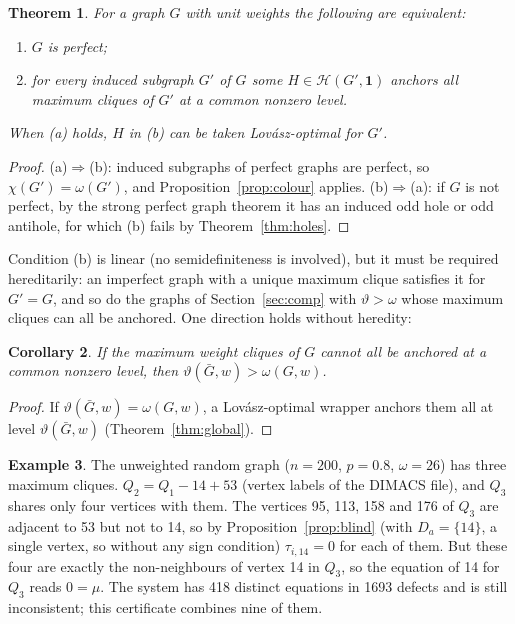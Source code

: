 \documentclass[11pt]{article}
\newtheorem{thm}{Theorem}[section]
\newtheorem{cor}[thm]{Corollary}
\theoremstyle{definition}
\newtheorem{example}[thm]{Example}
\theoremstyle{remark}
\newcommand{\Hc}{\mathcal{H}}
\newcommand{\one}{\mathbf{1}}
\newcommand{\vt}{\vartheta(\bar G,w)}
\newcommand{\om}{\omega(G,w)}
\newcommand{\gr}[1]{\texttt{\detokenize{#1}}}
\begin{document}
\begin{thm}
\label{thm:perfect}
For a graph $G$ with unit weights the following are equivalent:
\begin{enumerate}
\item[(a)] $G$ is perfect;
\item[(b)] for every induced subgraph $G'$ of $G$ some $H\in\Hc(G',\one)$
anchors all maximum cliques of $G'$ at a common nonzero level.
\end{enumerate}
When (a) holds, $H$ in (b) can be taken Lov\'asz-optimal for $G'$.
\end{thm}
\begin{proof}
(a)$\Rightarrow$(b): induced subgraphs of perfect graphs are perfect, so
$\chi(G')=\omega(G')$, and Proposition~\ref{prop:colour} applies.
(b)$\Rightarrow$(a): if $G$ is not perfect, by the strong perfect graph
theorem \cite{CRST06} it has an induced odd hole or odd antihole, for which
(b) fails by Theorem~\ref{thm:holes}.
\end{proof}

Condition (b) is linear (no semidefiniteness is involved), but it must be
required hereditarily: an imperfect graph with a unique maximum clique
satisfies it for $G'=G$, and so do the graphs of Section~\ref{sec:comp} with
$\vartheta>\omega$ whose maximum cliques can all be anchored. One direction
holds without heredity:

\begin{cor}
\label{cor:certificate}
If the maximum weight cliques of $G$ cannot all be anchored at a common
nonzero level, then $\vt>\om$.
\end{cor}
\begin{proof}
If $\vt=\om$, a Lov\'asz-optimal wrapper anchors them all at level $\vt$
(Theorem~\ref{thm:global}).
\end{proof}

\begin{example}
\label{ex:cascade}
The unweighted random graph \gr{g200_80_0} ($n=200$, $p=0.8$, $\omega=26$)
has three maximum cliques. $Q_2=Q_1-14+53$ (vertex labels of the DIMACS
file), and $Q_3$ shares only four vertices with them. The vertices 95, 113,
158 and 176 of $Q_3$ are adjacent to 53 but not to 14, so by
Proposition~\ref{prop:blind} (with $D_a=\{14\}$, a single vertex, so
without any sign condition) $\tau_{i,14}=0$ for each of them. But these four
are exactly the non-neighbours of vertex 14 in $Q_3$, so the equation of 14
for $Q_3$ reads $0=\mu$. The system has 418 distinct equations in 1693
defects and is still inconsistent; this certificate combines nine of them.
\end{example}
\end{document}
